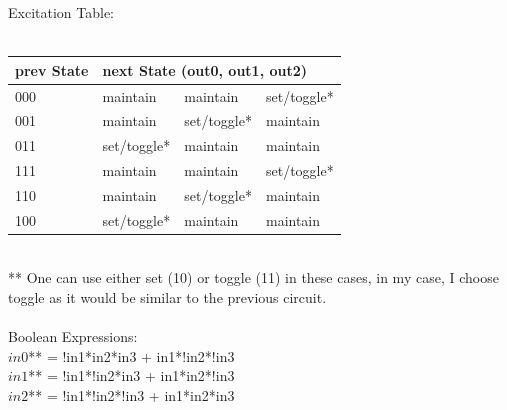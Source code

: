 \documentclass[letterpaper]{article} %
\begin{document}
\begin{enumerate}
\begin{enumerate}
      Excitation Table: \\ \\
      \begin{tabular}{|l|lll|}
        \hline
        prev State & \multicolumn{3}{|l|}{next State (out0, out1, out2)}       \\
        \hline
        000        & maintain   & maintain   & set/toggle* \\
        001        & maintain   & set/toggle* & maintain   \\
        011        & set/toggle* & maintain   & maintain   \\
        111        & maintain   & maintain   & set/toggle* \\
        110        & maintain   & set/toggle* & maintain   \\
        100        & set/toggle* & maintain   & maintain  \\
        \hline
      \end{tabular} \\
      ** One can use either set (10) or toggle (11) in these cases, in my case, I choose toggle as it would be similar to the previous circuit.  \\ \\
      Boolean Expressions: \\
      $in0$** =  !in1*in2*in3 + in1*!in2*!in3 \\
      $in1$** = !in1*!in2*in3 + in1*in2*!in3 \\
      $in2$**  = !in1*!in2*!in3 + in1*in2*in3 \\ \\


\end{enumerate}
\end{enumerate}
\end{document}
